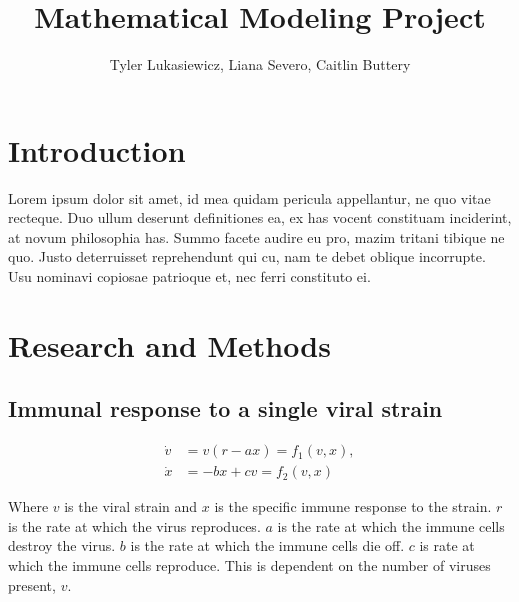 \documentclass{article}
\title{Mathematical Modeling Project}
\author{Tyler Lukasiewicz, Liana Severo, Caitlin Buttery}
\begin{document}
\maketitle
{}
\section{Introduction}
\label{sec:Introduction}
Lorem ipsum dolor sit amet, id mea quidam pericula appellantur, ne quo vitae recteque. Duo ullum deserunt definitiones ea, ex has vocent constituam inciderint, at novum philosophia has. Summo facete audire eu pro, mazim tritani tibique ne quo. Justo deterruisset reprehendunt qui cu, nam te debet oblique incorrupte. Usu nominavi copiosae patrioque et, nec ferri constituto ei.


\section{Research and Methods}
\label{sec:Main part}

\subsection{Immunal response to a single viral strain}
\begin{equation}
    \begin{split}
        \dot v &= v(r-ax) = f_1(v,x), \\
        \dot x &= -bx + cv = f_2(v,x)
    \end{split}
\end{equation}

Where $v$ is the viral strain and $x$ is the specific immune response to the strain. $r$ is the rate at which the virus reproduces. $a$ is the rate at which the immune cells destroy the virus. $b$ is the rate at which the immune cells die off. $c$ is rate at which the immune cells reproduce. This is dependent on the number of viruses present, $v$.  
\end{document}
